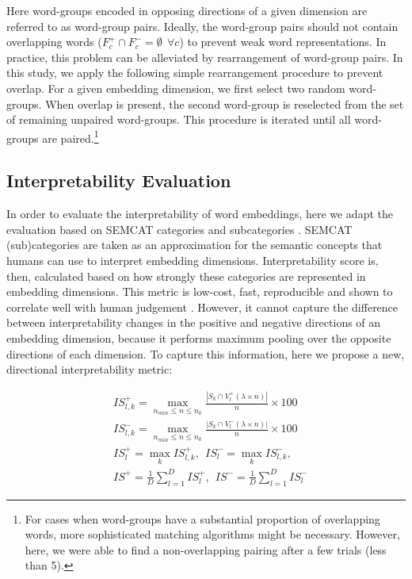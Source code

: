 \documentclass[11pt,a4paper]{article}
\begin{document}
Here word-groups encoded in opposing directions of a given
dimension are referred to as word-group pairs. Ideally, the
word-group pairs should not contain overlapping words
($F^+_c \cap F^-_c = \emptyset ~~\forall c$) to prevent weak
word representations. In practice, this problem can be
alleviated by rearrangement of word-group pairs. In this
study, we apply the following simple rearrangement procedure
to prevent overlap. For a given embedding dimension, we
first select two random word-groups. When overlap is
present, the second word-group is reselected from the set of
remaining unpaired word-groups. This procedure is iterated
until all word-groups are paired.\footnote{For cases when
  word-groups have a substantial proportion of overlapping
  words, more sophisticated matching algorithms might be
  necessary. However, here, we were able to find a
  non-overlapping pairing after a few trials (less than 5).}

\subsection{Interpretability Evaluation}
\label{sec:interp_eval}

In order to evaluate the interpretability of word embeddings, here we adapt the evaluation based on SEMCAT categories
\citep{senel18semanticStructure} and subcategories \citep{senel18trInterpret}. SEMCAT (sub)categories are taken as an approximation for the semantic concepts that humans can use to interpret embedding dimensions. Interpretability score is, then, calculated based on how strongly these categories are represented in embedding dimensions. This metric is low-cost, fast, reproducible and shown to correlate well with human judgement \citep{senel20impart}. However, it cannot capture the difference
between interpretability changes in the positive and
negative directions of an embedding dimension, because it
performs maximum pooling over the opposite directions of
each dimension. To capture this information, here we
propose a new, directional interpretability metric:

\begin{equation} \label{eq:interpretability_new}
\begin{split}
&IS^+_{l,k} = \max_{n_{min} \leq n \leq n_k } \frac{|S_k \cap V^+_l(\lambda \times n)|}{n} \times 100  \\
&IS^-_{l,k} = \max_{n_{min} \leq n \leq n_k } \frac{|S_k \cap V^-_l(\lambda \times n)|}{n} \times 100  \\
&IS^+_{l} = \max_{k} IS^+_{l,k}, ~~ IS^-_{l} = \max_{k} IS^-_{l,k},\\
&IS^+ = \frac{1}{D}\sum\limits_{l=1}^D IS^+_{l}, ~~ IS^- = \frac{1}{D}\sum\limits_{l=1}^D IS^-_{l}
\end{split}
\end{equation}
\end{document}
